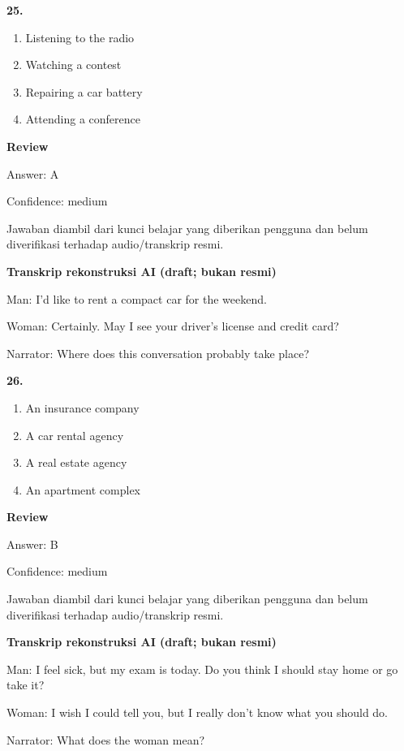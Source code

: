 \documentclass[12pt]{article}
\begin{document}
\noindent\textbf{25.}
\begin{enumerate}[label=(\Alph*),leftmargin=*,itemsep=0.2em]
\item Listening to the radio
\item Watching a contest
\item Repairing a car battery
\item Attending a conference
\end{enumerate}
\par
\begingroup
\setlength{\parskip}{0pt}
\setlength{\parindent}{0pt}
\textbf{Review}\par
Answer: A\par
Confidence: medium\par
Jawaban diambil dari kunci belajar yang diberikan pengguna dan belum diverifikasi terhadap audio/transkrip resmi.\par
\endgroup
\par
\vspace{0.25\baselineskip}
\begin{exampleblock}
\textbf{Transkrip rekonstruksi AI (draft; bukan resmi)}\par
Man: I'd like to rent a compact car for the weekend.\par
Woman: Certainly. May I see your driver's license and credit card?\par
Narrator: Where does this conversation probably take place?\par
\end{exampleblock}
\noindent\textbf{26.}
\begin{enumerate}[label=(\Alph*),leftmargin=*,itemsep=0.2em]
\item An insurance company
\item A car rental agency
\item A real estate agency
\item An apartment complex
\end{enumerate}
\par
\begingroup
\setlength{\parskip}{0pt}
\setlength{\parindent}{0pt}
\textbf{Review}\par
Answer: B\par
Confidence: medium\par
Jawaban diambil dari kunci belajar yang diberikan pengguna dan belum diverifikasi terhadap audio/transkrip resmi.\par
\endgroup
\par
\vspace{0.25\baselineskip}
\begin{exampleblock}
\textbf{Transkrip rekonstruksi AI (draft; bukan resmi)}\par
Man: I feel sick, but my exam is today. Do you think I should stay home or go take it?\par
Woman: I wish I could tell you, but I really don't know what you should do.\par
Narrator: What does the woman mean?\par
\end{exampleblock}
\end{document}
